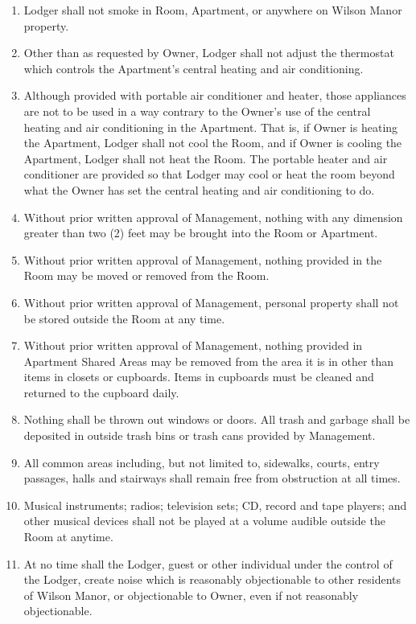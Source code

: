 \documentclass[12pt,letterpaper]{article}
\newcommand{\management}{Management}
\newcommand{\condo}{Wilson Manor}
\newcommand{\apt}{Apartment}
\newcommand{\room}{Room}
\newcommand{\shared}{Apartment Shared Areas}
\newcommand{\lodger}{Lodger}
\begin{document}
\begin{enumerate}
	\item \lodger{} shall not smoke in \room{}, \apt{}, or anywhere on \condo{} property.
	\item Other than as requested by Owner, \lodger{} shall not adjust the thermostat which controls the \apt{}'s central heating and air conditioning.
	\item Although provided with portable air conditioner and heater, those appliances are not to be used in a way contrary to the Owner's use of the central heating and air conditioning in the \apt{}. That is, if Owner is heating the \apt{}, \lodger{} shall not cool the \room{}, and if Owner is cooling the \apt{}, \lodger{} shall not heat the \room{}. The portable heater and air conditioner are provided so that \lodger{} may cool or heat the room beyond what the Owner has set the central heating and air conditioning to do.
	\item Without prior written approval of \management{}, nothing with any dimension greater than two (2) feet may be brought into the \room{} or \apt{}.
	\item Without prior written approval of \management{}, nothing provided in the \room{} may be moved or removed from the \room{}.
	\item Without prior written approval of \management{}, personal property shall not be stored outside the \room{} at any time. 
	\item Without prior written approval of \management{}, nothing provided in \shared{} may be removed from the area it is in other than items in closets or cupboards. Items in cupboards must be cleaned and returned to the cupboard daily.
	\item Nothing shall be thrown out windows or doors. All trash and garbage shall be deposited in outside trash bins or trash cans provided by \management{}. 
	\item All common areas including, but not limited to, sidewalks, courts, entry passages, halls and stairways shall remain free from obstruction at all times. 
	\item Musical instruments; radios; television sets; CD, record and tape players; and other musical devices shall not be played at a volume audible outside the \room{} at anytime. 
	\item At no time shall the \lodger{}, guest or other individual under the control of the \lodger{}, create noise which is reasonably objectionable to other residents of \condo{}, or objectionable to Owner, even if not reasonably objectionable. 

\end{enumerate}
\end{document}
